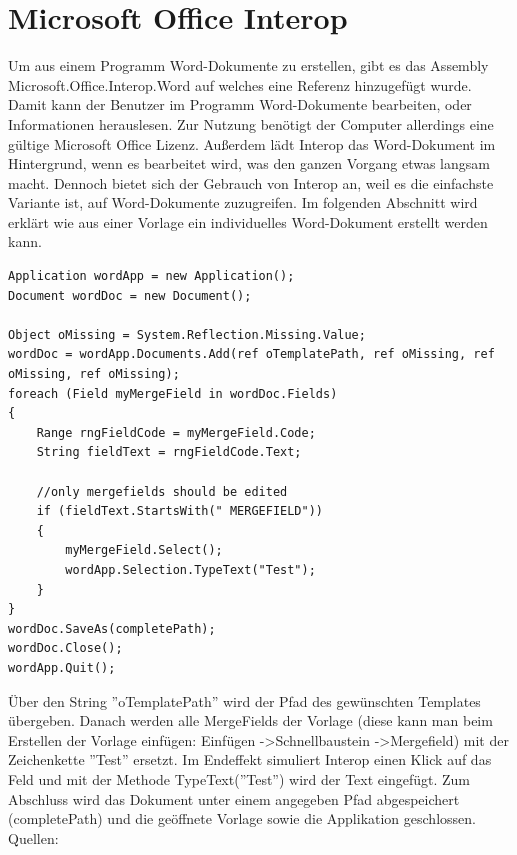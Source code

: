 \section{Microsoft Office Interop}
Um aus einem Programm Word-Dokumente zu erstellen, gibt es das Assembly Microsoft.Office.Interop.Word auf welches eine Referenz hinzugefügt wurde. Damit kann der Benutzer im Programm Word-Dokumente bearbeiten, oder Informationen herauslesen. Zur Nutzung benötigt der Computer allerdings eine gültige Microsoft Office Lizenz.  Außerdem lädt Interop das Word-Dokument im Hintergrund, wenn es bearbeitet wird, was den ganzen Vorgang etwas langsam macht.
Dennoch bietet sich der Gebrauch von Interop an, weil es die einfachste Variante ist, auf Word-Dokumente zuzugreifen.
Im folgenden Abschnitt wird erklärt wie aus einer Vorlage ein individuelles Word-Dokument erstellt werden kann.
\begin{lstlisting}
Application wordApp = new Application();
Document wordDoc = new Document();

Object oMissing = System.Reflection.Missing.Value;
wordDoc = wordApp.Documents.Add(ref oTemplatePath, ref oMissing, ref oMissing, ref oMissing);
foreach (Field myMergeField in wordDoc.Fields)
{
	Range rngFieldCode = myMergeField.Code;
	String fieldText = rngFieldCode.Text;

	//only mergefields should be edited
	if (fieldText.StartsWith(" MERGEFIELD"))
	{
		myMergeField.Select();
		wordApp.Selection.TypeText("Test");
	}
}
wordDoc.SaveAs(completePath);
wordDoc.Close();
wordApp.Quit();
\end{lstlisting}
Über den String ''oTemplatePath'' wird der Pfad des gewünschten Templates übergeben. Danach werden alle MergeFields der Vorlage (diese kann man beim Erstellen der Vorlage einfügen: Einfügen -\textgreater Schnellbaustein -\textgreater Mergefield) mit der Zeichenkette ''Test'' ersetzt. Im Endeffekt simuliert Interop einen Klick auf das Feld und mit der Methode TypeText(''Test'') wird der Text eingefügt. Zum Abschluss wird das Dokument unter einem angegeben Pfad abgespeichert (completePath) und die geöffnete Vorlage sowie die Applikation geschlossen. \newline
Quellen: \cite{gembox_microsoft_2018}
